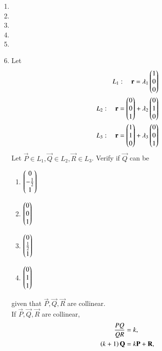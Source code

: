 \documentclass[journal,12pt,twocolumn]{IEEEtran}
\renewcommand\thesection{\arabic{section}}
\begin{document}
\begin{enumerate}[label=\thesection.\arabic*
,ref=\thesection.\theenumi]
\begin{enumerate}
\end{enumerate}
\item
\item
\item
\item
\item
\item Let
\begin{align}
\label{eq:qp2-8-l_1}
L_1: \quad \mathbf{r} = \lambda_1 \begin{pmatrix}1\\0\\0\end{pmatrix}
\\
\label{eq:qp2-8-l_2}
L_2: \quad \mathbf{r} = \begin{pmatrix}0\\0\\1\end{pmatrix}+\lambda_2 \begin{pmatrix}0\\1\\0\end{pmatrix}
\\
L_3: \quad \mathbf{r} =  \begin{pmatrix}1\\1\\0\end{pmatrix}+\lambda_3 \begin{pmatrix}0\\0\\1\end{pmatrix}
\label{eq:qp2-8-l_3}
\end{align}
%
Let $\vec{P}\in L_1, \vec{Q}\in L_2, \vec{R}\in L_3$. Verify if  $\vec{Q}$ can be 
\begin{enumerate}
\item $\begin{pmatrix}0\\-\frac{1}{2} \\ 1\end{pmatrix}$
\item $\begin{pmatrix}0\\ 0\\1\end{pmatrix}$
\item $\begin{pmatrix}0\\ \frac{1}{2} \\1\end{pmatrix}$
\item $\begin{pmatrix}0\\1 \\1\end{pmatrix}$
\end{enumerate}
given that   $\vec{P},\vec{Q},\vec{R}$ are collinear.
\\
\solution 
If $\vec{P},\vec{Q},\vec{R}$ are collinear,
\begin{align}
\frac{PQ}{QR} &= k,
\\
\left(k+1\right)\mathbf{Q} &= k\mathbf{P}+ \mathbf{R},
\label{eq:qp2-8-coll}
\end{align}

\end{enumerate}
\end{document}
